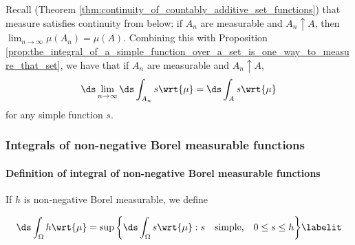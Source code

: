 \documentclass{article} %
\begin{document}
\begin{remark}{}
Recall (Theorem \ref{thm:continuity_of_countably_additive_set_functions}) that measure satisfies continuity from below: if $A_n$ are measurable and $A_n \uparrow A$, then $\lim_{n \to \infty} \mu(A_n) = \mu(A)$.    Combining this with Proposition \ref{prop:the_integral_of_a_simple_function_over_a_set_is_one_way_to_measure_that_set}, we have that if $A_n$ are measurable and $A_n \uparrow A$,
\[ \ds\lim_{n \to \infty} \ds\int_{A_n} s \wrt{\mu} =  \ds\int_A s \wrt{\mu} \]
for any simple function $s$.  
\label{rk:continuity_of_measure_applied_to_measures_given_by_integrals_of_simple_functions_over_sets}
\end{remark}



\subsubsection{Integrals of non-negative Borel measurable functions}

\paragraph{Definition of integral of non-negative Borel measurable functions}

\begin{definition}
If $h$ is non-negative Borel measurable, we define 

\begin{align*}
\ds\int_{\Omega} h \wrt{\mu} = \sup \bigg\{ \ds\int_{\Omega} s \wrt{\mu} : s \quad \text{simple,} \quad 0 \leq s \leq h  \bigg\} 
\labelit \label{eqn:def_integral_of_non_negative_Borel_measurable_function}
\end{align*}
\label{def:integral_of_non_negative_Borel_measurable_function}
\end{definition}
\end{document}
